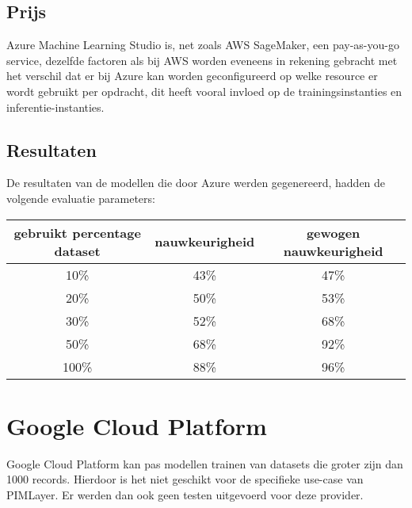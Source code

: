 \subsection{Prijs}
Azure Machine Learning Studio is, net zoals AWS SageMaker, een pay-as-you-go service, dezelfde factoren als bij AWS worden eveneens in rekening gebracht met het verschil dat er bij Azure kan worden geconfigureerd op welke resource er wordt gebruikt per opdracht, dit heeft vooral invloed op de trainingsinstanties en inferentie-instanties. 
\subsection{Resultaten}
De resultaten van de modellen die door Azure werden gegenereerd, hadden de volgende evaluatie parameters:
\begin{center}
    \begin{tabular} {|c | c | c |}
        \hline
        gebruikt percentage dataset & nauwkeurigheid & gewogen nauwkeurigheid \\
        \hline
        10\% & 43\% & 47\% \\
        \hline
        20\% & 50\% & 53\% \\
        \hline
        30\% & 52\% & 68\% \\
        \hline
        50\% & 68\% & 92\% \\
        \hline
        100\% & 88\% & 96\% \\
        \hline
    \end{tabular}
\end{center}
\section{Google Cloud Platform}
Google Cloud Platform kan pas modellen trainen van datasets die groter zijn dan 1000 records. Hierdoor is het niet geschikt voor de specifieke use-case van PIMLayer. Er werden dan ook geen testen uitgevoerd voor deze provider.


